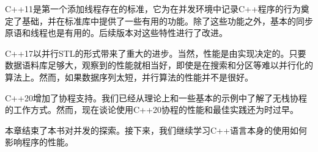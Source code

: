 C++11是第一个添加线程存在的标准，它为在并发环境中记录C++程序的行为奠定了基础，并在标准库中提供了一些有用的功能。除了这些功能之外，基本的同步原语和线程也是有用的。后续版本对这些特性进行了改进。

C++17以并行STL的形式带来了重大的进步。当然，性能是由实现决定的。只要数据语料库足够大，观察到的性能就相当好，即使是在搜索和分区等难以并行化的算法上。然而，如果数据序列太短，并行算法的性能并不是很好。

C++20增加了协程支持。我们已经从理论上和一些基本的示例中了解了无栈协程的工作方式。然而，现在谈论使用C++20协程的性能和最佳实践还为时过早。

本章结束了本书对并发的探索。接下来，我们继续学习C++语言本身的使用如何影响程序的性能。